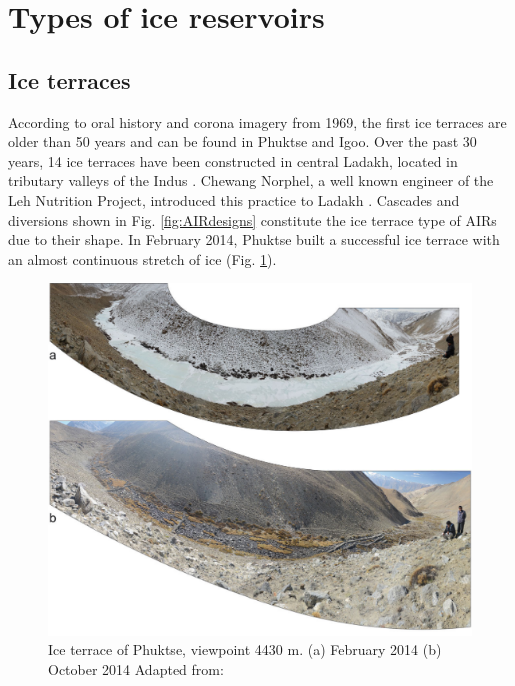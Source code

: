 \section{Types of ice reservoirs}

\subsection{Ice terraces}

According to oral history and corona imagery from 1969, the first ice terraces are older than 50 years and can
be found in Phuktse and Igoo. Over the past 30 years, 14 ice terraces have been constructed in central Ladakh,
located in tributary valleys of the Indus \citep{norphelArtificialGlacierHigh2009,
nusserSociohydrologyArtificialGlaciers2019}. Chewang Norphel, a well known engineer of the Leh Nutrition
Project, introduced this practice to Ladakh \citep{vinceGlacierMan2009}. Cascades and diversions shown in Fig.
\ref{fig:AIRdesigns} constitute the ice terrace type of AIRs due to their shape. In February 2014, Phuktse built
a successful ice terrace with an almost continuous stretch of ice (Fig. \ref{fig:ITexample}).

\begin{figure}[htb]
\centering
\includegraphics[width=\textwidth]{figs/IT_example.png}
\caption{Ice terrace of Phuktse, viewpoint 4430 m. (a) February 2014 (b) October 2014 Adapted from: \cite{nusserSociohydrologyArtificialGlaciers2019}}
\label{fig:ITexample}
\end{figure}

